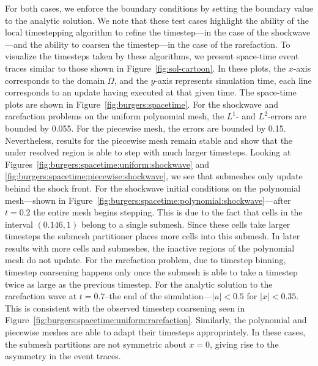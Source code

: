 For both cases, we enforce the boundary conditions by setting the boundary value to the analytic solution. We note that these test cases highlight the ability of the local timestepping algorithm to refine the timestep---in the case of the shockwave---and the ability to coarsen the timestep---in the case of the rarefaction. To visualize the timesteps taken by these algorithms, we present space-time event traces similar to those shown in Figure~\ref{fig:sol-cartoon}. In these plots, the $x$-axis corresponds to the domain $\Omega$, and the $y$-axis represents simulation time, each line corresponds to an update having executed at that given time. The space-time plots are shown in Figure~\ref{fig:burgers:spacetime}.  For the shockwave and rarefaction problems on the uniform polynomial mesh, the $L^1$- and $L^2$-errors are bounded by 0.055. For the piecewise mesh, the errors are bounded by 0.15. Nevertheless, results for the piecewise mesh remain stable and show that the under resolved region is able to step with much larger timesteps. Looking at Figures~\ref{fig:burgers:spacetime:uniform:shockwave} and \ref{fig:burgers:spacetime:piecewise:shockwave}, we see that submeshes only update behind the shock front. For the shockwave initial conditions on the polynomial mesh---shown in Figure~\ref{fig:burgers:spacetime:polynomial:shockwave}---after $t=0.2$ the entire mesh begins stepping. This is due to the fact that cells in the interval $(0.146, 1)$ belong to a single submesh. Since these cells take larger timesteps the submesh partitioner places more cells into this submesh. In later results with more cells and submeshes, the inactive regions of the polynomial mesh do not update.
For the rarefaction problem, due to timestep binning, timestep coarsening happens only once the submesh is able to take a timestep twice as large as the previous timestep. 
For the analytic solution to the rarefaction wave at $t=0.7$--the end of the simulation---$|u|<0.5$ for $|x|<0.35$. This is consistent with the observed timestep  coarsening seen in Figure~\ref{fig:burgers:spacetime:uniform:rarefaction}. Similarly, the polynomial and piecewise meshes are able to adapt their timesteps appropriately. In these cases, the submesh partitions are not symmetric about $x=0$, giving rise to the asymmetry in the event traces.


